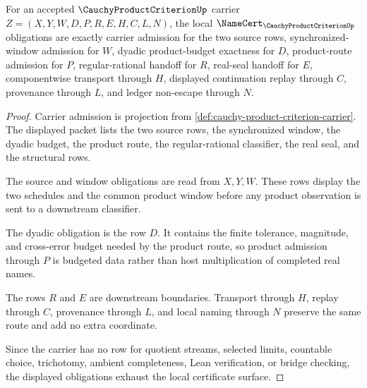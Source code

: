 \begin{theorem}
\label{thm:cauchy-product-criterion-namecert-obligations}
For an accepted $\CauchyProductCriterionUp$ carrier $Z=(X,Y,W,D,P,R,E,H,C,L,N)$, the local $\NameCert_{\CauchyProductCriterionUp}$ obligations are exactly carrier admission for the two source rows, synchronized-window admission for $W$, dyadic product-budget exactness for $D$, product-route admission for $P$, regular-rational handoff for $R$, real-seal handoff for $E$, componentwise transport through $H$, displayed continuation replay through $C$, provenance through $L$, and ledger non-escape through $N$.
\end{theorem}
\begin{proof}
Carrier admission is projection from \autoref{def:cauchy-product-criterion-carrier}. The displayed packet lists the two source rows, the synchronized window, the dyadic budget, the product route, the regular-rational classifier, the real seal, and the structural rows.

The source and window obligations are read from $X,Y,W$. These rows display the two schedules and the common product window before any product observation is sent to a downstream classifier.

The dyadic obligation is the row $D$. It contains the finite tolerance, magnitude, and cross-error budget needed by the product route, so product admission through $P$ is budgeted data rather than host multiplication of completed real names.

The rows $R$ and $E$ are downstream boundaries. Transport through $H$, replay through $C$, provenance through $L$, and local naming through $N$ preserve the same route and add no extra coordinate.

Since the carrier has no row for quotient streams, selected limits, countable choice, trichotomy, ambient completeness, Lean verification, or bridge checking, the displayed obligations exhaust the local certificate surface.
\end{proof}


